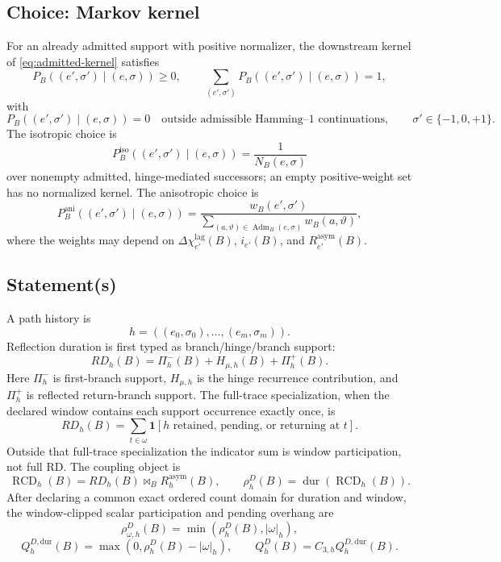 \subsection{Choice: Markov kernel}
\label{app:rd-tests:markov-kernel}
For an already admitted support with positive normalizer, the downstream kernel of \eqref{eq:admitted-kernel} satisfies
\[
P_B((e',\sigma')\mid(e,\sigma))\ge0,
\qquad
\sum_{(e',\sigma')}P_B((e',\sigma')\mid(e,\sigma))=1,
\]
with
\[
P_B((e',\sigma')\mid(e,\sigma))=0
\quad\text{outside admissible Hamming--1 continuations},
\qquad
\sigma'\in\{-1,0,+1\}.
\]
The isotropic choice is
\[
P_B^{\mathrm{iso}}((e',\sigma')\mid(e,\sigma))=
\frac{1}{N_B(e,\sigma)}
\]
over nonempty admitted, hinge-mediated successors; an empty positive-weight set has no normalized kernel. The anisotropic choice is
\[
P_B^{\mathrm{ani}}((e',\sigma')\mid(e,\sigma))=
\frac{w_B(e',\sigma')}
{\sum_{(a,\vartheta)\in\operatorname{Adm}_B(e,\sigma)}w_B(a,\vartheta)},
\]
where the weights may depend on \(\Delta\chi^{\mathrm{lag}}_{e'}(B)\), \(i_{e'}(B)\), and \(R^{\mathrm{asym}}_{e'}(B)\).

\subsection{Statement(s)}
\label{app:rd-tests:statements}
A path history is
\[
h=((e_0,\sigma_0),\ldots,(e_m,\sigma_m)).
\]
Reflection duration is first typed as branch/hinge/branch support:
\begin{equation}
RD_h(B)
=
\Pi^-_h(B)
+
H_{\mu,h}(B)
+
\Pi^+_h(B).
\label{app:rd:eq:branch-hinge-rd}
\end{equation}
Here \(\Pi^-_h\) is first-branch support, \(H_{\mu,h}\) is the hinge recurrence contribution, and \(\Pi^+_h\) is reflected return-branch support. The full-trace specialization, when the declared window contains each support occurrence exactly once, is
\[
RD_h(B)=
\sum_{t\in\omega}
\mathbf 1[h\text{ retained, pending, or returning at }t].
\]
Outside that full-trace specialization the indicator sum is window participation, not full RD. The coupling object is
\[
\operatorname{RCD}_h(B)=RD_h(B)\bowtie_B R^{\mathrm{asym}}_h(B),
\qquad
\rho^D_h(B)=\operatorname{dur}(\operatorname{RCD}_h(B)).
\]
After declaring a common exact ordered count domain for duration and window, the window-clipped scalar participation and pending overhang are
\[
\rho^D_{\omega,h}(B)=\min(\rho^D_h(B),|\omega|_h),
\]
\[
Q^{D,\mathrm{dur}}_h(B)=\max(0,\rho^D_h(B)-|\omega|_h),
\qquad
Q^D_h(B)=C_{3,h}Q^{D,\mathrm{dur}}_h(B).
\]

